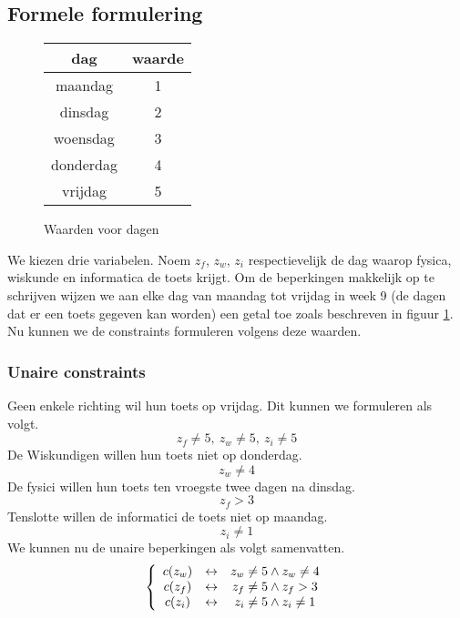 \documentclass[alternative-exam.tex]{subfiles}
\begin{document}
\subsection{Formele formulering}
\begin{figure}[H]
\centering
\caption{Waarden voor dagen}
\label{waarde_dagen}
\begin{tabular}{| c | c | }
\hline
dag & waarde\\
\hline
maandag & 1\\
dinsdag & 2\\
woensdag & 3\\
donderdag & 4\\
vrijdag & 5\\
\hline
\end{tabular}
\end{figure}
We kiezen drie variabelen. Noem $z_f$, $z_w$, $z_i$ respectievelijk de dag waarop fysica, wiskunde en informatica de toets krijgt. Om de beperkingen makkelijk op te schrijven wijzen we aan elke dag van maandag tot vrijdag in week 9 (de dagen dat er een toets gegeven kan worden) een getal toe zoals beschreven in figuur \ref{waarde_dagen}.
Nu kunnen we de constraints formuleren volgens deze waarden.

\subsubsection{Unaire constraints}
Geen enkele richting wil hun toets op vrijdag. Dit kunnen we formuleren als volgt.
\[z_f \neq 5,\ z_w \neq 5,\ z_i \neq 5\]
De Wiskundigen willen hun toets niet op donderdag.
\[
z_w \neq 4
\]
De fysici willen hun toets ten vroegste twee dagen na dinsdag.
\[
z_f > 3
\]
Tenslotte willen de informatici de toets niet op maandag.
\[
z_i \neq 1
\]
We kunnen nu de unaire beperkingen als volgt samenvatten.
\[
\left\lbrace
\begin{array}{c c c}
c(z_w) & \leftrightarrow & z_w \neq 5 \wedge z_w \neq 4\\
c(z_f) & \leftrightarrow & z_f \neq 5 \wedge z_f > 3\\
c(z_i) & \leftrightarrow & z_i \neq 5 \wedge z_i \neq 1\\
\end{array}
\right.
\]
\end{document}
